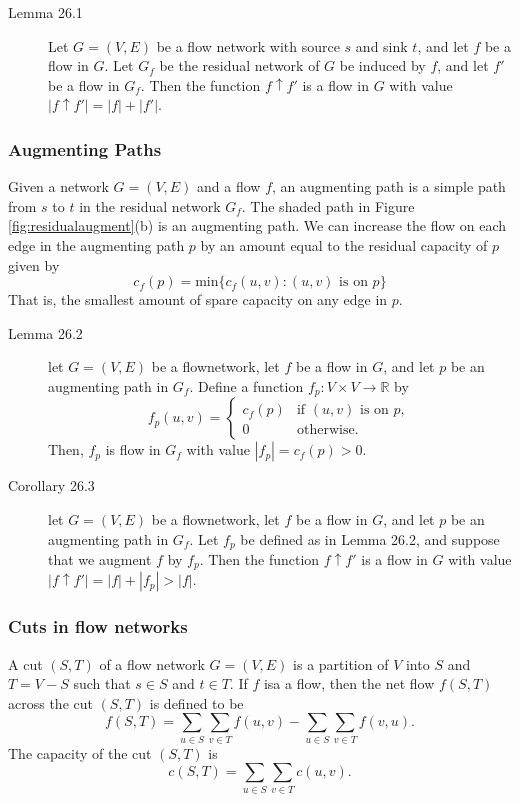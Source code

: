 \begin{description}
\item[Lemma 26.1] Let $G = (V,E)$ be a flow network with source $s$ and sink
  $t$, and let $f$ be a flow in $G$. Let $G_f$ be the residual network of $G$ be
  induced by $f$, and let $f'$ be a flow in $G_f$. Then the function $f\uparrow
  f'$ is a flow in $G$ with value $|f\uparrow f'| = |f| + |f'|$.
\end{description}

\subsubsection{Augmenting Paths}
Given a network $G=(V,E)$ and a flow $f$, an augmenting path is a simple path
from $s$ to $t$ in the residual network $G_f$. The shaded path in Figure
\ref{fig:residualaugment}(b) is an augmenting path. We can increase the flow on
each edge in the augmenting path $p$ by an amount equal to the residual capacity
of $p$ given by
\[
  c_f(p) = \text{min}\{c_f(u,v) : (u,v)\text{ is on }p\}
\]
That is, the smallest amount of spare capacity on any edge in $p$.

\begin{description}
\item[Lemma 26.2] let $G = (V,E)$ be a flownetwork, let $f$ be a flow in $G$,
  and let $p$ be an augmenting path in $G_f$. Define a function $f_p : V \times
  V \rightarrow \mathbb{R}$ by
  \[
    f_p(u,v) =
      \begin{cases}
        c_f(p) & \text{if } (u,v) \text{ is on } p, \\
        0      & \text{otherwise}.
      \end{cases}
  \]
  Then, $f_p$ is flow in $G_f$ with value $|f_p| = c_f(p) > 0$.

\item[Corollary 26.3] let $G = (V,E)$ be a flownetwork, let $f$ be a flow in
  $G$, and let $p$ be an augmenting path in $G_f$. Let $f_p$ be defined as in
  Lemma 26.2, and suppose that we augment $f$ by $f_p$. Then the function $f
  \uparrow f'$ is a flow in $G$ with value $|f\uparrow f'| = |f|+|f_p| > |f|$.
\end{description}

\subsubsection{Cuts in flow networks}
A cut $(S,T)$ of a flow network $G=(V,E)$ is a partition of $V$ into $S$ and $T
= V - S$ such that $s\in S$ and $t \in T$. If $f$ isa a flow, then the net flow
$f(S,T)$ across the cut $(S,T)$ is defined to be
\[
  f(S,T) = \sum_{u\in S}\sum_{v\in T} f(u,v) - \sum_{u\in S}\sum_{v\in T} f(v,u).
\]
The capacity of the cut $(S,T)$ is
\[
  c(S,T) = \sum_{u\in S}\sum_{v\in T} c(u,v).
\]

